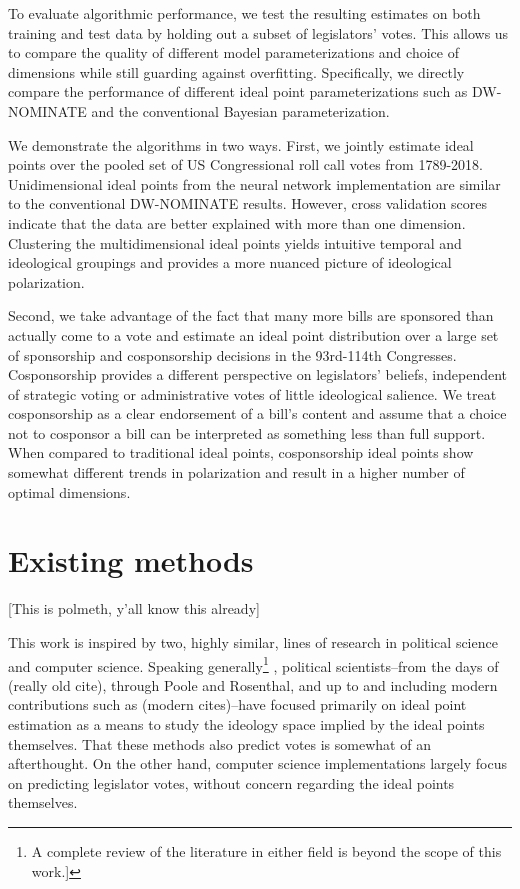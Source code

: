 \documentclass[11pt,]{article}
\begin{document}
To evaluate algorithmic performance, we test the resulting estimates on
both training and test data by holding out a subset of legislators'
votes. This allows us to compare the quality of different model
parameterizations and choice of dimensions while still guarding against
overfitting. Specifically, we directly compare the performance of
different ideal point parameterizations such as DW-NOMINATE and the
conventional Bayesian parameterization.

We demonstrate the algorithms in two ways. First, we jointly estimate
ideal points over the pooled set of US Congressional roll call votes
from 1789-2018. Unidimensional ideal points from the neural network
implementation are similar to the conventional DW-NOMINATE results.
However, cross validation scores indicate that the data are better
explained with more than one dimension. Clustering the multidimensional
ideal points yields intuitive temporal and ideological groupings and
provides a more nuanced picture of ideological polarization.

Second, we take advantage of the fact that many more bills are sponsored
than actually come to a vote and estimate an ideal point distribution
over a large set of sponsorship and cosponsorship decisions in the
93rd-114th Congresses. Cosponsorship provides a different perspective on
legislators' beliefs, independent of strategic voting or administrative
votes of little ideological salience. We treat cosponsorship as a clear
endorsement of a bill's content and assume that a choice not to
cosponsor a bill can be interpreted as something less than full support.
When compared to traditional ideal points, cosponsorship ideal points
show somewhat different trends in polarization and result in a higher
number of optimal dimensions.

\section{Existing methods}\label{existing-methods}

{[}This is polmeth, y'all know this already{]}

This work is inspired by two, highly similar, lines of research in
political science and computer science. Speaking generally\footnote{A
  complete review of the literature in either field is beyond the scope
  of this work.{]}} , political scientists--from the days of (really old
cite), through Poole and Rosenthal, and up to and including modern
contributions such as (modern cites)--have focused primarily on ideal
point estimation as a means to study the ideology space implied by the
ideal points themselves. That these methods also predict votes is
somewhat of an afterthought. On the other hand, computer science
implementations largely focus on predicting legislator votes, without
concern regarding the ideal points themselves.
\end{document}
